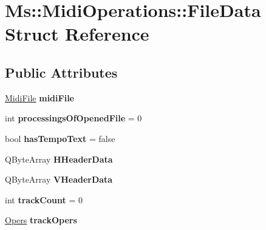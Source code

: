 \hypertarget{struct_ms_1_1_midi_operations_1_1_file_data}{}\section{Ms\+:\+:Midi\+Operations\+:\+:File\+Data Struct Reference}
\label{struct_ms_1_1_midi_operations_1_1_file_data}
\subsection*{Public Attributes}
\begin{DoxyCompactItemize}
\item 
\mbox{\label{struct_ms_1_1_midi_operations_1_1_file_data_a45e66cd443f89834c818e5efb5a9b1df}} 
\hyperlink{class_ms_1_1_midi_file}{Midi\+File} {\bfseries midi\+File}
\item 
\mbox{\label{struct_ms_1_1_midi_operations_1_1_file_data_aa3835c3c07330a673f96a4d1474e0cb7}} 
int {\bfseries processings\+Of\+Opened\+File} = 0
\item 
\mbox{\label{struct_ms_1_1_midi_operations_1_1_file_data_a173ab07f2e863b64214d7d6fc1799293}} 
bool {\bfseries has\+Tempo\+Text} = false
\item 
\mbox{\label{struct_ms_1_1_midi_operations_1_1_file_data_a3608d36bcd9160bebf13d5e11641952a}} 
Q\+Byte\+Array {\bfseries H\+Header\+Data}
\item 
\mbox{\label{struct_ms_1_1_midi_operations_1_1_file_data_ad2be8b84e342d272cb63ac872221e7d8}} 
Q\+Byte\+Array {\bfseries V\+Header\+Data}
\item 
\mbox{\label{struct_ms_1_1_midi_operations_1_1_file_data_add36f199196638c2b36c6f6f3411074c}} 
int {\bfseries track\+Count} = 0
\item 
\mbox{\label{struct_ms_1_1_midi_operations_1_1_file_data_a18e756c705f725d461e32a199d2ea5b2}} 
\hyperlink{struct_ms_1_1_midi_operations_1_1_opers}{Opers} {\bfseries track\+Opers}

\end{DoxyCompactItemize}
